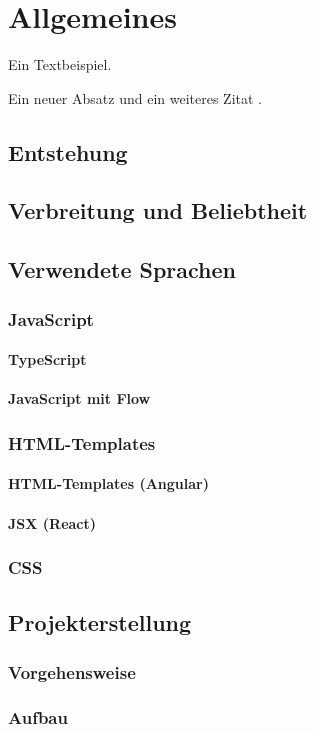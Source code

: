 \chapter{Allgemeines}
Ein Textbeispiel. \cite{schlosser}

Ein neuer Absatz und ein weiteres Zitat \cite{nadler}.

\section{Entstehung}
\section{Verbreitung und Beliebtheit}

\section{Verwendete Sprachen}

\subsection{JavaScript}

\subsubsection{TypeScript}
\subsubsection{JavaScript mit Flow}


\subsection{HTML-Templates}
\subsubsection{HTML-Templates (Angular)}
\subsubsection{JSX (React)}

\subsection{CSS}

\section{Projekterstellung}
\subsection{Vorgehensweise}
\subsection{Aufbau}
